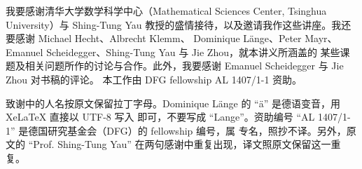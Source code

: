 我要感谢清华大学数学科学中心（Mathematical Sciences Center, Tsinghua University）与
Shing-Tung Yau 教授的盛情接待，以及邀请我作这些讲座。我还要感谢 Michael Hecht、Albrecht Klemm、
Dominique Länge、Peter Mayr、Emanuel Scheidegger、Shing-Tung Yau 与 Jie Zhou，就本讲义所涵盖的
某些课题及相关问题所作的讨论与合作。此外，我要感谢 Emanuel Scheidegger 与 Jie Zhou 对书稿的评论。
本工作由 DFG fellowship AL 1407/1-1 资助。

\begin{yizhu}[含糊点]
致谢中的人名按原文保留拉丁字母。Dominique Länge 的 “ä” 是德语变音，用 XeLaTeX 直接以 UTF-8 写入
即可，不要写成 “Lange”。资助编号 “AL 1407/1-1” 是德国研究基金会（DFG）的 fellowship 编号，属
专名，照抄不译。另外，原文的 “Prof. Shing-Tung Yau” 在两句感谢中重复出现，译文照原文保留这一重复。
\end{yizhu}

